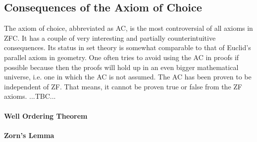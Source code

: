 







\subsection{Consequences of the Axiom of Choice}
The axiom of choice, abbreviated as AC, is the most controversial of all axioms in ZFC. It has a couple of very interesting and partially counterintuitive consequences. Its status in set theory is somewhat comparable to that of Euclid's parallel axiom in geometry. One often tries to avoid using the AC in proofs if possible because then the proofs will hold up in an even bigger mathematical universe, i.e. one in which the AC is not assumed. The AC has been proven to be independent of ZF. That means, it cannot be proven true or false from the ZF axioms. ...TBC...


\paragraph{Well Ordering Theorem}





\paragraph{Zorn's Lemma}

